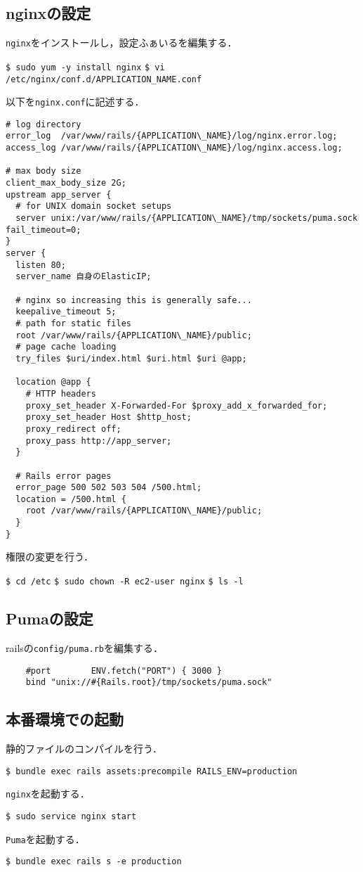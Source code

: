 \subsection{nginxの設定}
\texttt{nginx}をインストールし，設定ふぁいるを編集する．
\begin{screen}
    \texttt{\$ sudo yum -y install nginx}
    \texttt{\$ vi /etc/nginx/conf.d/APPLICATION\_NAME.conf}
\end{screen}
以下を\texttt{nginx.conf}に記述する．
\begin{screen}
\begin{lstlisting}
# log directory
error_log  /var/www/rails/{APPLICATION\_NAME}/log/nginx.error.log; 
access_log /var/www/rails/{APPLICATION\_NAME}/log/nginx.access.log;

# max body size
client_max_body_size 2G;
upstream app_server {
  # for UNIX domain socket setups
  server unix:/var/www/rails/{APPLICATION\_NAME}/tmp/sockets/puma.sock fail_timeout=0; 
}
server {
  listen 80;
  server_name 自身のElasticIP;

  # nginx so increasing this is generally safe...
  keepalive_timeout 5;
  # path for static files
  root /var/www/rails/{APPLICATION\_NAME}/public;
  # page cache loading
  try_files $uri/index.html $uri.html $uri @app;

  location @app {
    # HTTP headers
    proxy_set_header X-Forwarded-For $proxy_add_x_forwarded_for;
    proxy_set_header Host $http_host;
    proxy_redirect off;
    proxy_pass http://app_server;
  }

  # Rails error pages
  error_page 500 502 503 504 /500.html;
  location = /500.html {
    root /var/www/rails/{APPLICATION\_NAME}/public; 
  }
}
\end{lstlisting}
\end{screen}
権限の変更を行う．
\begin{screen}
    \texttt{\$ cd /etc}
    \texttt{\$ sudo chown -R ec2-user nginx}
    \texttt{\$ ls -l}
\end{screen}

\subsection{Pumaの設定}
railsの\texttt{config/puma.rb}を編集する．
\begin{lstlisting}
    #port        ENV.fetch("PORT") { 3000 }
    bind "unix://#{Rails.root}/tmp/sockets/puma.sock"       
\end{lstlisting}

\subsection{本番環境での起動}
静的ファイルのコンパイルを行う．
\begin{screen}
    \texttt{\$ bundle exec rails assets:precompile RAILS\_ENV=production}
\end{screen}
\texttt{nginx}を起動する．
\begin{screen}
    \texttt{\$ sudo service nginx start}
\end{screen}
\texttt{Puma}を起動する．
\begin{screen}
    \texttt{\$ bundle exec rails s -e production}
\end{screen}